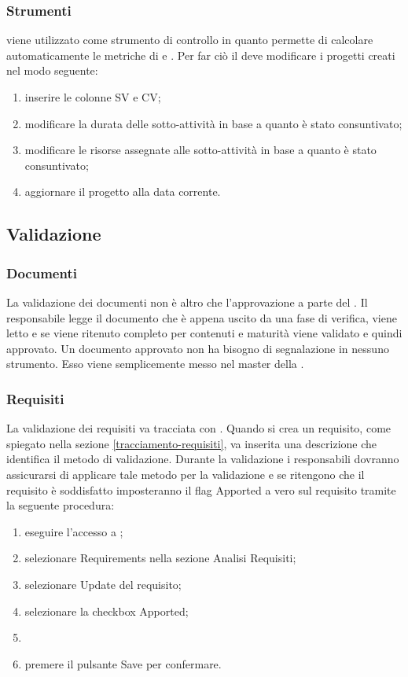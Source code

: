 \documentclass[12pt,a4paper]{article}
\begin{document}
\subsubsection{Strumenti}
 viene utilizzato come strumento di controllo in quanto permette di calcolare automaticamente le metriche di  e . Per far ciò il \RE deve modificare i progetti creati nel modo seguente:
\begin{enumerate}
	\item inserire le colonne SV e CV;
	\item modificare la durata delle sotto-attività in base a quanto è stato consuntivato;
	\item modificare le risorse assegnate alle sotto-attività in base a quanto è stato consuntivato;
	\item aggiornare il progetto alla data corrente.
\end{enumerate}

\subsection{Validazione}
\subsubsection{Documenti}
La validazione dei documenti non è altro che l'approvazione a parte del \RE. Il responsabile legge il documento che è appena uscito da una fase di verifica, viene letto e se viene ritenuto completo per contenuti e maturità viene validato e quindi approvato. Un documento approvato non ha bisogno di segnalazione in nessuno strumento. Esso viene semplicemente messo nel  master della .

\subsubsection{Requisiti}
La validazione dei requisiti va tracciata con . Quando si crea un requisito, come spiegato nella sezione \ref{tracciamento-requisiti}, va inserita una descrizione che identifica il metodo di validazione. Durante la validazione i responsabili dovranno assicurarsi di applicare tale metodo per la validazione e se ritengono che il requisito è soddisfatto imposteranno il flag Apported a vero sul requisito tramite la seguente procedura:
\begin{enumerate}
	\item eseguire l'accesso a ;
	\item selezionare Requirements nella sezione Analisi Requisiti;
	\item selezionare Update del requisito;
	\item selezionare la checkbox Apported;
	\item \item premere il pulsante Save per confermare.
\end{enumerate}
\end{document}
